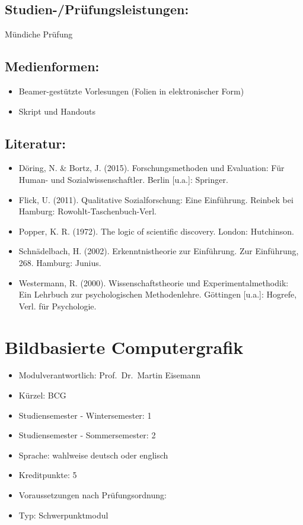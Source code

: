 \section*{Studien-/Prüfungsleistungen:}\label{studien-pruxfcfungsleistungen-14}

Mündiche Prüfung

\section*{Medienformen:}\label{medienformen-14}

\begin{itemize}
\tightlist
\item
  Beamer-gestützte Vorlesungen (Folien in elektronischer Form)
\item
  Skript und Handouts
\end{itemize}

\section*{Literatur:}\label{literatur-11}

\begin{itemize}
\tightlist
\item
  Döring, N. \& Bortz, J. (2015). Forschungsmethoden und Evaluation: Für
  Human- und Sozialwissenschaftler. Berlin {[}u.a.{]}: Springer.
\item
  Flick, U. (2011). Qualitative Sozialforschung: Eine Einführung.
  Reinbek bei Hamburg: Rowohlt-Taschenbuch-Verl.
\item
  Popper, K. R. (1972). The logic of scientific discovery. London:
  Hutchinson.
\item
  Schnädelbach, H. (2002). Erkenntnistheorie zur Einführung. Zur
  Einführung, 268. Hamburg: Junius.
\item
  Westermann, R. (2000). Wissenschaftstheorie und Experimentalmethodik:
  Ein Lehrbuch zur psychologischen Methodenlehre. Göttingen {[}u.a.{]}:
  Hogrefe, Verl. für Psychologie.
\end{itemize}

\chapter{Bildbasierte Computergrafik}\label{bildbasierte-computergrafik}

\begin{itemize}
\tightlist
\item
  Modulverantwortlich: Prof.~Dr.~Martin Eisemann
\item
  Kürzel: BCG
\item
  Studiensemester - Wintersemester: 1
\item
  Studiensemester - Sommersemester: 2
\item
  Sprache: wahlweise deutsch oder englisch
\item
  Kreditpunkte: 5
\item
  Voraussetzungen nach Prüfungsordnung: ~
\item
  Typ: Schwerpunktmodul
\end{itemize}

